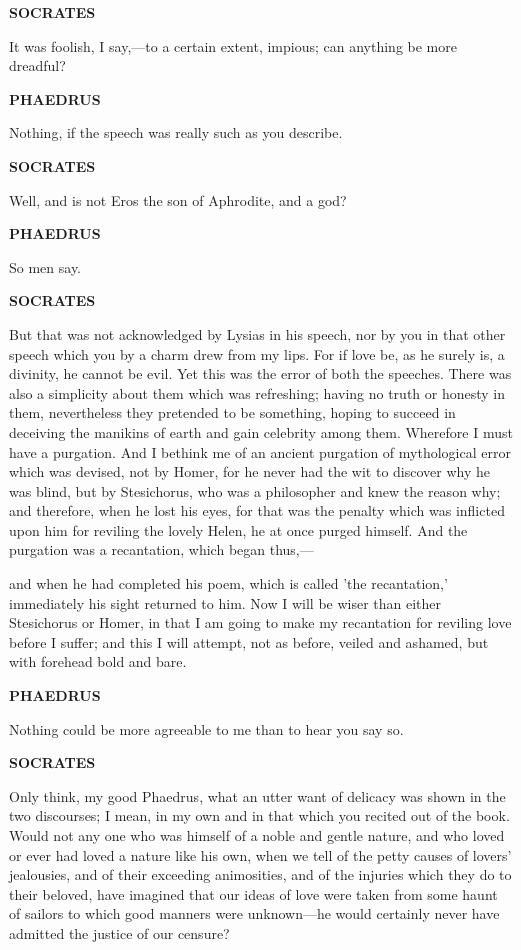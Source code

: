 \documentclass[11pt,letter]{article}
\begin{document}
\par \textbf{SOCRATES}
\par   It was foolish, I say,—to a certain extent, impious; can anything be more dreadful?

\par \textbf{PHAEDRUS}
\par   Nothing, if the speech was really such as you describe.

\par \textbf{SOCRATES}
\par   Well, and is not Eros the son of Aphrodite, and a god?

\par \textbf{PHAEDRUS}
\par   So men say.

\par \textbf{SOCRATES}
\par   But that was not acknowledged by Lysias in his speech, nor by you in that other speech which you by a charm drew from my lips. For if love be, as he surely is, a divinity, he cannot be evil. Yet this was the error of both the speeches. There was also a simplicity about them which was refreshing; having no truth or honesty in them, nevertheless they pretended to be something, hoping to succeed in deceiving the manikins of earth and gain celebrity among them. Wherefore I must have a purgation. And I bethink me of an ancient purgation of mythological error which was devised, not by Homer, for he never had the wit to discover why he was blind, but by Stesichorus, who was a philosopher and knew the reason why; and therefore, when he lost his eyes, for that was the penalty which was inflicted upon him for reviling the lovely Helen, he at once purged himself. And the purgation was a recantation, which began thus,—
 
\par  and when he had completed his poem, which is called 'the recantation,' immediately his sight returned to him. Now I will be wiser than either Stesichorus or Homer, in that I am going to make my recantation for reviling love before I suffer; and this I will attempt, not as before, veiled and ashamed, but with forehead bold and bare.

\par \textbf{PHAEDRUS}
\par   Nothing could be more agreeable to me than to hear you say so.

\par \textbf{SOCRATES}
\par   Only think, my good Phaedrus, what an utter want of delicacy was shown in the two discourses; I mean, in my own and in that which you recited out of the book. Would not any one who was himself of a noble and gentle nature, and who loved or ever had loved a nature like his own, when we tell of the petty causes of lovers' jealousies, and of their exceeding animosities, and of the injuries which they do to their beloved, have imagined that our ideas of love were taken from some haunt of sailors to which good manners were unknown—he would certainly never have admitted the justice of our censure?
\end{document}
